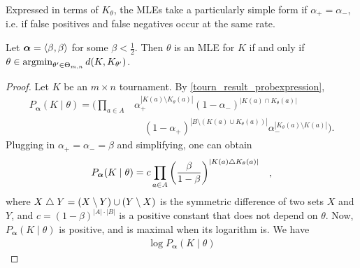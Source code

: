 Expressed in terms of $K_\theta$, the MLEs take a
particularly simple form if $\alpha_+ = \alpha_-$, i.e. if false positives and
false negatives occur at the same rate.

\begin{lemma}
   \label{tourn_result_mle_hamming}

   Let $\bm{\alpha} = \langle {\beta, \beta} \rangle$ for some $\beta < \frac{1}{2}$.
   Then $\theta$ is an MLE for $K$ if and only if $\theta \in \operatorname{argmin}_{\theta'
   \in \Theta_{m,n}}{d(K, K_{\theta'})}$.
\end{lemma}

\begin{proof}

    Let $K$ be an $m \times n$ tournament. By
    \cref{tourn_result_probexpression},
    \begin{equation*}
       \begin{split}
           P_{\bm{\alpha}}(K \mid \theta)
           =
           \Big(
           \prod_{a \in A}
             &\alpha_+^{|K(a) \setminus K_\theta(a)|}
             (1 - \alpha_-)^{|K(a) \cap K_\theta(a)|}
             \\
             &\quad (1 - \alpha_+)^{|B \setminus (K(a) \cup K_\theta(a))|}
             \alpha_-^{|K_\theta(a) \setminus K(a)|}
           \Big).
       \end{split}
    \end{equation*}
    Plugging in $\alpha_+ = \alpha_- = \beta$ and simplifying, one can obtain
    \[
       \begin{aligned}
       P_{\bm{\alpha}}(K \mid \theta)
           &=  c
               \prod_{a \in A}{
                \left(
                  \frac{\beta}{1 - \beta}
                \right)^{
                  |K(a) \mathrel{\triangle} K_\theta(a)|
                }
           }
       \end{aligned},
    \]
    where $X \mathrel{\triangle} Y = (X \setminus Y) \cup (Y \setminus X)$ is the
    symmetric difference of two sets $X$ and $Y$, and $c = (1
    - \beta)^{|A| \cdot |B|}$ is a positive constant that does not depend on
    $\theta$. Now, $P_{\bm{\alpha}}(K \mid \theta)$ is positive, and is maximal
    when its logarithm is. We have
    \[
       \begin{aligned}
           \log{P_{\bm{\alpha}}(K \mid \theta)}

\end{aligned}\]
\end{proof}

